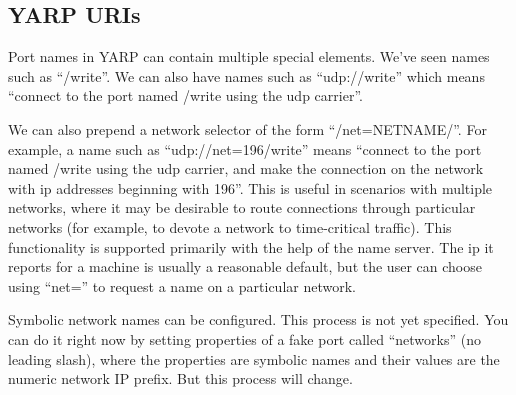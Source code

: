 \documentclass[a4]{article}
\begin{document}










\subsection{YARP URIs}

Port names in YARP can contain multiple special elements.
We've seen names such as ``/write''.  We can also have
names such as ``udp://write'' which means ``connect
to the port named /write using the udp carrier''.

We can also prepend a network selector of the form
``/net=NETNAME/''.  For example, a name such as
``udp://net=196/write'' means ``connect to the 
port named /write using the udp carrier, and make the
connection on the network with ip addresses beginning with
196''.
%
This is useful in scenarios with multiple networks, where it may be
desirable to route connections through particular networks (for
example, to devote a network to time-critical traffic).  This
functionality is supported primarily with the help of the name server.
The ip it reports for a machine is usually a reasonable default, but
the user can choose using ``net='' to request a name on a particular
network.

Symbolic network names can be configured.  This process is not yet
specified.  You can do it right now by setting properties of a fake
port called ``networks'' (no leading slash), where the properties are
symbolic names and their values are the numeric network IP prefix.
But this process will change.
\end{document}
